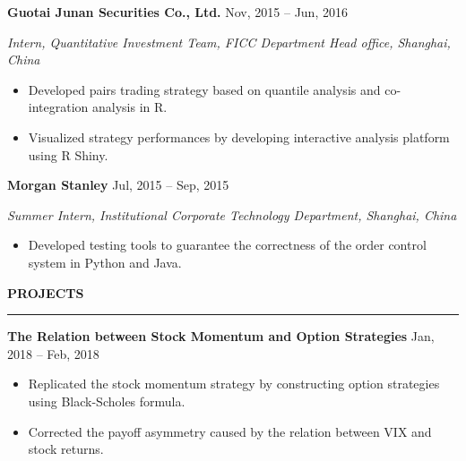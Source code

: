 \documentclass[a4paper,12pt]{report}
\newcommand{\marginAdj}{0.5in}
\begin{document}
\noindent 
\textbf{Guotai Junan Securities Co., Ltd.}{\fontsize{9pt}{9pt}\selectfont  \hspace*{2.85in}  \hspace*{\marginAdj} {\fontsize{12pt}{12pt}\selectfont Nov, 2015 – Jun, 2016}} \par
\noindent 
{\fontsize{12pt}{12pt}\selectfont \textit{Intern, Quantitative Investment Team, FICC Department Head office, Shanghai, China}} \par
\noindent 
\begin{itemize}[noitemsep,topsep=0pt]
\item {\fontsize{12pt}{12pt}\selectfont Developed pairs trading strategy based on quantile analysis and co-integration analysis in R.} \par
\item {\fontsize{12pt}{12pt}\selectfont Visualized strategy performances by developing interactive analysis platform using R Shiny.} \par
\end{itemize}

\noindent 
\textbf{Morgan Stanley}{\fontsize{9pt}{9pt}\selectfont  \hspace*{4.15in} \hspace*{\marginAdj} {\fontsize{12pt}{12pt}\selectfont Jul, 2015 – Sep, 2015}} \par
\noindent 
{\fontsize{12pt}{12pt}\selectfont \textit{Summer Intern, Institutional Corporate Technology Department, Shanghai, China}} \par
\noindent 
\begin{itemize}[noitemsep,topsep=0pt]
\item {\fontsize{12pt}{12pt}\selectfont Developed testing tools to guarantee the correctness of the order control system in Python and Java.} \par
\end{itemize}
 \par
\vspace{9pt}



\noindent 
\textbf{PROJECTS} \par
\vspace{2pt}
\hrule
\vspace{6pt}

\noindent
\textbf{The Relation between Stock Momentum and Option Strategies}  \hspace*{\marginAdj}  \hspace*{0.80in} {\fontsize{12pt}{12pt}\selectfont Jan, 2018 – Feb, 2018} \par
\noindent 
\begin{itemize}[noitemsep,topsep=0pt]
	\item {\fontsize{12pt}{12pt}\selectfont Replicated the stock momentum strategy by constructing option strategies using Black-Scholes formula.} \par
	\item {\fontsize{12pt}{12pt}\selectfont Corrected the payoff asymmetry caused by the relation between VIX and stock returns.} \par
\end{itemize}
\end{document}
